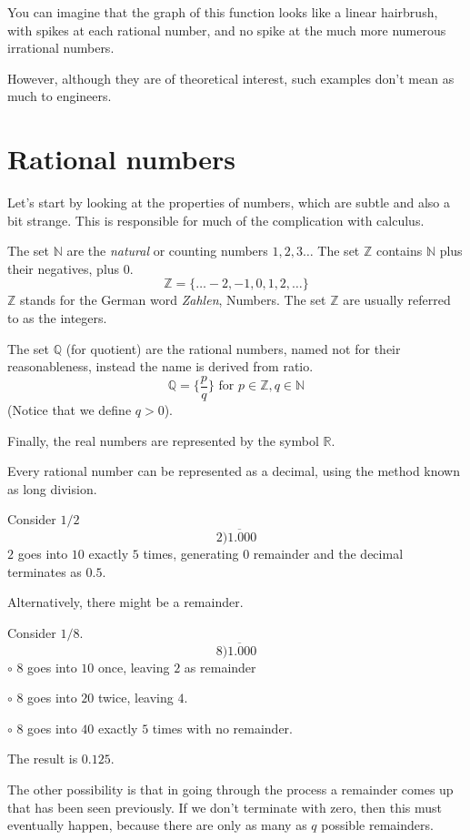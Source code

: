 \documentclass[11pt, oneside]{article}   	%
\begin{document}
You can imagine that the graph of this function looks like a linear hairbrush, with spikes at each rational number, and no spike at the much more numerous irrational numbers.

However, although they are of theoretical interest, such examples don't mean as much to engineers.

\section*{Rational numbers}
Let's start by looking at the properties of numbers, which are subtle and also a bit strange.  This is responsible for much of the complication with calculus.

The set $\mathbb{N}$ are the \emph{natural} or counting numbers $1,2,3 \dots$  The set $\mathbb{Z}$ contains $\mathbb{N}$ plus their negatives, plus $0$.  
\[ \mathbb{Z} = \{ \dots -2, -1, 0, 1, 2, \dots \} \]
$\mathbb{Z}$ stands for the German word \emph{Zahlen}, Numbers.  The set $\mathbb{Z}$ are usually referred to as the integers.

The set $\mathbb{Q}$ (for quotient) are the rational numbers, named not for their reasonableness, instead the name is derived from ratio. 
\[ \mathbb{Q} = \{ \frac{p}{q} \} \text{ for } p \in \mathbb{Z}, q \in \mathbb{N} \]
(Notice that we define $q > 0$).

Finally, the real numbers are represented by the symbol $\mathbb{R}$.

Every rational number can be represented as a decimal, using the method known as long division.

Consider $1/2$
\[ 2 \overline{)1.000} \]
$2$ goes into $10$ exactly $5$ times, generating $0$ remainder and the decimal terminates as $0.5$.

Alternatively, there might be a remainder.

Consider $1/8$.
\[ 8 \overline{)1.000} \]
$\circ$  $8$ goes into $10$ once, leaving $2$ as remainder

$\circ$  $8$ goes into $20$ twice, leaving $4$.  

$\circ$  $8$ goes into $40$ exactly $5$ times with no remainder.

The result is $0.125$.

The other possibility is that in going through the process a remainder comes up that has been seen previously.  If we don't terminate with zero, then this must eventually happen, because there are only as many as $q$ possible remainders.
\end{document}
